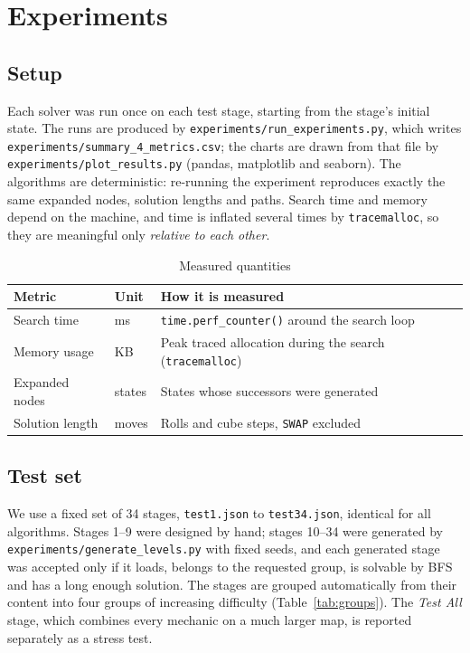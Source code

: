 \section{Experiments}

\subsection{Setup}

Each solver was run once on each test stage, starting from the stage's initial state. The runs
are produced by \texttt{experiments/run\_experiments.py}, which writes
\texttt{experiments/summary\_4\_metrics.csv}; the charts are drawn from that file by
\texttt{experiments/plot\_results.py} (pandas, matplotlib and seaborn). The algorithms are
deterministic: re-running the experiment reproduces exactly the same expanded nodes, solution
lengths and paths. Search time and memory depend on the machine, and time is inflated several times
by \texttt{tracemalloc}, so they are meaningful only \emph{relative to each other}.

\begin{table}[H]
\centering
\caption{Measured quantities}
\label{tab:metrics}
\begin{tabularx}{\linewidth}{llX}
\toprule
\textbf{Metric} & \textbf{Unit} & \textbf{How it is measured} \\
\midrule
Search time & ms & \texttt{time.perf\_counter()} around the search loop \\
Memory usage & KB & Peak traced allocation during the search (\texttt{tracemalloc}) \\
Expanded nodes & states & States whose successors were generated \\
Solution length & moves & Rolls and cube steps, \texttt{SWAP} excluded \\
\bottomrule
\end{tabularx}
\end{table}

\subsection{Test set}

We use a fixed set of 34 stages, \texttt{test1.json} to \texttt{test34.json}, identical for all
algorithms. Stages 1--9 were designed by hand; stages 10--34 were generated by
\texttt{experiments/generate\_levels.py} with fixed seeds, and each generated stage was accepted
only if it loads, belongs to the requested group, is solvable by BFS and has a long enough
solution. The stages are grouped automatically from their content into four groups of increasing
difficulty (Table~\ref{tab:groups}). The \emph{Test All} stage, which combines every mechanic on a
much larger map, is reported separately as a stress test.

